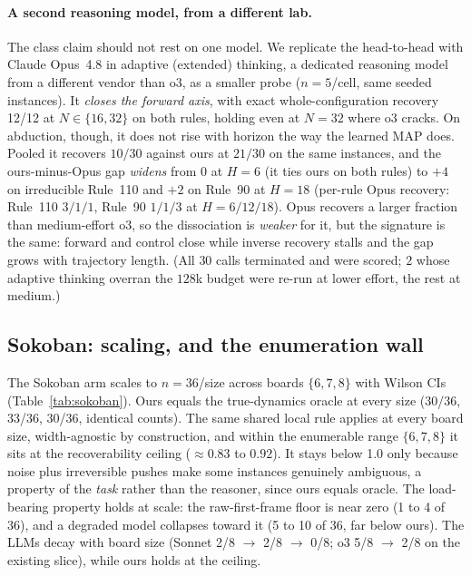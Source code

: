 \documentclass{article}
\begin{document}
\paragraph{A second reasoning model, from a different lab.}
The class claim should not rest on one model. We replicate the head-to-head with Claude Opus~4.8 in
adaptive (extended) thinking, a dedicated reasoning model from a different vendor than o3, as a
smaller probe ($n=5$/cell, same seeded instances). It \emph{closes the forward axis}, with exact
whole-configuration recovery 12/12 at $N\in\{16,32\}$ on both rules, holding even at $N{=}32$ where o3
cracks. On abduction, though, it does not rise with horizon the way the learned MAP does. Pooled it
recovers $10/30$ against ours at $21/30$ on the same instances, and the ours-minus-Opus gap
\emph{widens} from $0$ at $H{=}6$ (it ties ours on both rules) to $+4$ on irreducible Rule~110 and
$+2$ on Rule~90 at $H{=}18$ (per-rule Opus recovery: Rule~110 $3/1/1$, Rule~90 $1/1/3$ at
$H{=}6/12/18$). Opus recovers a larger fraction than medium-effort o3, so the dissociation is
\emph{weaker} for it, but the signature is the same: forward and control close while inverse recovery
stalls and the gap grows with trajectory length. (All $30$ calls terminated and were scored; $2$ whose
adaptive thinking overran the $128$k budget were re-run at lower effort, the rest at medium.)

\subsection{Sokoban: scaling, and the enumeration wall}

The Sokoban arm scales to $n=36$/size across boards $\{6,7,8\}$ with Wilson CIs
(Table~\ref{tab:sokoban}). Ours equals the true-dynamics oracle at every size (30/36, 33/36, 30/36,
identical counts). The same shared local rule applies at every board size, width-agnostic by
construction, and within the enumerable range $\{6,7,8\}$ it sits at the recoverability ceiling
($\approx 0.83$ to $0.92$). It
stays below 1.0 only because noise plus irreversible pushes make some instances genuinely ambiguous,
a property of the \emph{task} rather than the reasoner, since ours equals oracle. The load-bearing
property holds at scale: the raw-first-frame floor is near zero (1 to 4 of 36), and a degraded model
collapses toward it (5 to 10 of 36, far below ours). The LLMs decay with board size (Sonnet 2/8
$\rightarrow$ 2/8 $\rightarrow$ 0/8; o3 5/8 $\rightarrow$ 2/8 on the existing slice), while ours holds
at the ceiling.
\end{document}
